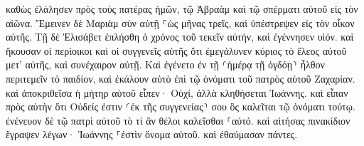 \documentclass{openreader}
\begin{document}
καθὼς ἐλάλησεν πρὸς τοὺς πατέρας ἡμῶν, τῷ Ἀβραὰμ καὶ τῷ σπέρματι αὐτοῦ εἰς τὸν αἰῶνα. 
Ἔμεινεν δὲ Μαριὰμ σὺν αὐτῇ ⸀ὡς μῆνας τρεῖς, καὶ ὑπέστρεψεν εἰς τὸν οἶκον αὐτῆς. 
Τῇ δὲ Ἐλισάβετ ἐπλήσθη ὁ χρόνος τοῦ τεκεῖν αὐτήν, καὶ ἐγέννησεν υἱόν. 
καὶ ἤκουσαν οἱ περίοικοι καὶ οἱ συγγενεῖς αὐτῆς ὅτι ἐμεγάλυνεν κύριος τὸ ἔλεος αὐτοῦ μετ’ αὐτῆς, καὶ συνέχαιρον αὐτῇ. 
Καὶ ἐγένετο ἐν τῇ ⸂ἡμέρᾳ τῇ ὀγδόῃ⸃ ἦλθον περιτεμεῖν τὸ παιδίον, καὶ ἐκάλουν αὐτὸ ἐπὶ τῷ ὀνόματι τοῦ πατρὸς αὐτοῦ Ζαχαρίαν. 
καὶ ἀποκριθεῖσα ἡ μήτηρ αὐτοῦ εἶπεν· Οὐχί, ἀλλὰ κληθήσεται Ἰωάννης. 
καὶ εἶπαν πρὸς αὐτὴν ὅτι Οὐδείς ἐστιν ⸂ἐκ τῆς συγγενείας⸃ σου ὃς καλεῖται τῷ ὀνόματι τούτῳ. 
ἐνένευον δὲ τῷ πατρὶ αὐτοῦ τὸ τί ἂν θέλοι καλεῖσθαι ⸀αὐτό. 
καὶ αἰτήσας πινακίδιον ἔγραψεν λέγων· Ἰωάννης ⸀ἐστὶν ὄνομα αὐτοῦ. καὶ ἐθαύμασαν πάντες. 
\end{document}
